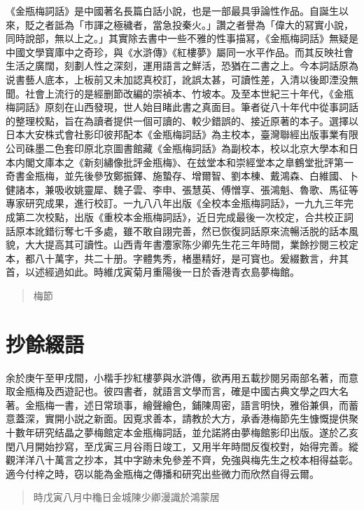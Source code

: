 《金瓶梅詞話》是中國著名長篇白話小說，也是一部最具爭論性作品。自誕生以來，貶之者詆為「市諢之極穢者，當急投秦火。」讚之者譽為「偉大的冩實小說，同時說部，無以上之。」其實除去書中一些不雅的性事描冩，《金瓶梅詞話》無疑是中國文學寳庫中之奇珍，與《水滸傳》《紅樓夢》屬同一水平作品。而其反映社會生活之廣闊，刻劃人性之深刻，運用語言之鮮活，恐猶在二書之上。今本詞話原為说書藝人底本，上板前又未加認真校訂，訛誤太甚，可讀性差，入清以後即湮没無聞。社會上流行的是經删節改編的崇禎本、竹坡本。及至本世紀三十年代，《金瓶梅詞話》原刻在山西發現，世人始目睹此書之真面目。筆者従八十年代中從事詞話的整理校點，旨在為讀者提供一個可讀的、較少錯誤的、接近原著的本子。選擇以日本大安株式會社影印彼邦配本《金瓶梅詞話》為主校本，臺灣聯經出版事業有限公司硃墨二色套印原北京圖書館藏《金瓶梅詞話》為副校本，校以北京大學本和日本内閣文庫本之《新刻繡像批評金瓶梅》、在玆堂本和崇經堂本之臯鶴堂批評第一奇書金瓶梅，並先後參攷鄭振鐸、施蟄存、增爾智、劉本棟、戴鴻森、白維國、卜健諸本，兼吸收姚靈犀、魏子雲、李申、張慧英、傅憎享、張鴻魁、魯歌、馬征等專家研究成果，進行校訂。一九八八年出版《全校本金瓶梅詞話》，一九九三年完成第二次校點，出版《重校本金瓶梅詞話》，近日完成最後一次校定，合共校正詞話原本訛錯衍奪七千多處，雖不敢自詡完善，然已恢復詞話原來流暢活脱的話本風貌，大大提高其可讀性。山西青年書灋家陈少卿先生花三年時間，業餘抄閱三校定本，都八十萬字，共二十册。字體隽秀，楮墨精好，是可寳也。爰綴數言，弁其首，以述經過如此。時維戊寅菊月重陽後一日於香港青衣島夢梅館。

\begin{quotation}\begin{flushright}梅節\end{flushright}\end{quotation}

\chapter*{抄餘綴語}

余於庚午至甲戌間，小楷手抄紅樓夢與水滸傳，欲再用五載抄閱另兩部名著，而意取金瓶梅及西遊記也。彼四書者，就語言文學而言，確是中國古典文學之四大名著。金瓶梅一書，述日常琐事，繪聲繪色，鋪陳周密，語言明快，雅俗兼俱，而蓄意蓋深，實開小説之新面。因覔求善本，請教於大方，承香港梅節先生慷慨提供聚十數年研究结晶之夢梅館定本金瓶梅詞話，並允諾將由夢梅館影印出版。遂於乙亥閏八月開始抄寫，至戊寅三月谷雨日竣工，又用半年時間反復校對，始得完善。縱觀洋洋八十萬言之抄本，其中字跡未免參差不齊，免強與梅先生之校本相得益彰。適今付梓之時，窃以能為金瓶梅之傳播和研究出些微力而欣然自得云爾。

\begin{quotation}\begin{flushright}時戊寅八月中龝日金城陳少卿漫識於鴻蒙居\end{flushright}\end{quotation}

